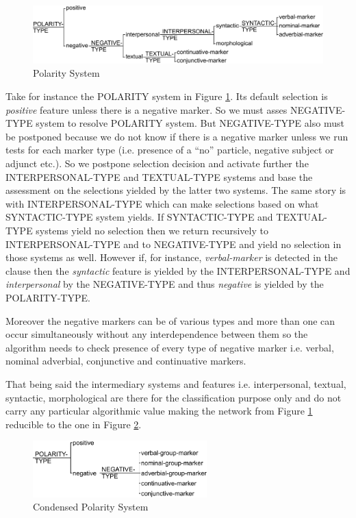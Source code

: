 \begin{figure}[H]
\centering
\includegraphics[width=\textwidth]{Figures/SFL-grammar/polarity-system.pdf}
\caption{Polarity System}
\label{fig:polarity1}
\end{figure}

Take for instance the POLARITY system in Figure \ref{fig:polarity1}. Its default selection is \textit{positive} feature unless there is a negative marker. So we must asses NEGATIVE-TYPE system to resolve POLARITY system. But NEGATIVE-TYPE also must be postponed because we do not know if there is a negative marker unless we run tests for each marker type (i.e. presence of a ``no'' particle, negative subject or adjunct etc.). So we postpone selection decision and activate further the INTERPERSONAL-TYPE and TEXTUAL-TYPE systems and base the assessment on the selections yielded by the latter two systems. The same story is with INTERPERSONAL-TYPE which can make selections based on what SYNTACTIC-TYPE system yields. If SYNTACTIC-TYPE and TEXTUAL-TYPE systems yield no selection then we return recursively to INTERPERSONAL-TYPE and to NEGATIVE-TYPE and yield no selection in those systems as well. However if, for instance, \textit{verbal-marker} is detected in the clause then the \textit{syntactic} feature is yielded by the INTERPERSONAL-TYPE and \textit{interpersonal} by the NEGATIVE-TYPE and thus \textit{negative} is yielded by the POLARITY-TYPE. 

Moreover the negative markers can be of various types and more than one can occur simultaneously without any interdependence between them so the algorithm needs to check presence of every type of negative marker i.e. verbal, nominal adverbial, conjunctive and continuative markers. 

That being said the intermediary systems and features i.e. interpersonal, textual, syntactic, morphological are there for the classification purpose only and do not carry any particular algorithmic value making the network from Figure \ref{fig:polarity1} reducible to the one in Figure \ref{fig:polarity1-condensed}. 

\begin{figure}[H]
\centering
\includegraphics[width=0.6\textwidth]{Figures/SFL-grammar/polarity-condensed.pdf}
\caption{Condensed Polarity System}
\label{fig:polarity1-condensed}
\end{figure}


